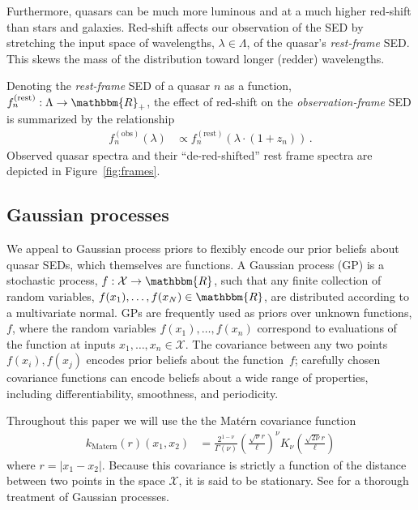 \documentclass{article}
\newcommand{\R}{\mathbbm{R}}
\newcommand{\mcX}{\mathcal{X}}
\begin{document}
Furthermore, quasars can be much more luminous and at a much higher red-shift than stars and galaxies.  
Red-shift affects our observation of the SED by stretching the input space of wavelengths, $\lambda \in \Lambda$, of the quasar's \emph{rest-frame} SED.  
This skews the mass of the distribution toward longer (redder) wavelengths. 

Denoting the \emph{rest-frame} SED of a quasar $n$ as a function, $f_n^{(\text{rest})} : \Lambda \rightarrow \R_+$, the effect of red-shift on the \emph{observation-frame} SED is summarized by the relationship 
\begin{align}
  f_n^{(\text{obs})}(\lambda) &\propto f_n^{(\text{rest})}(\lambda \cdot (1 + z_n)) \, .
\end{align}
Observed quasar spectra and their ``de-red-shifted'' rest frame spectra are depicted in Figure~\ref{fig:frames}.

\subsection{Gaussian processes}
We appeal to Gaussian process priors to flexibly encode our prior beliefs about quasar SEDs, which themselves are functions. A Gaussian process (GP) is a stochastic process, $f: \mathcal{X} \rightarrow \R$, such that any finite collection of random variables, ${f(x_1),\dots, f(x_N) \in \R}$, are distributed according to a multivariate normal.  
GPs are frequently used as priors over unknown functions, $f$, where the random variables $f(x_1), \dots, f(x_n)$ correspond to evaluations of the function at inputs $x_1, \dots, x_n \in \mcX$.  
The covariance between any two points $f(x_i), f(x_j)$ encodes prior beliefs about the function~$f$; carefully chosen covariance functions can encode beliefs about a wide range of properties, including differentiability, smoothness, and periodicity.  

Throughout this paper we will use the the Mat\'{e}rn \cite{Matern1986spatial} covariance function
\begin{align}
  k_{\text{Matern}}(r)(x_1, x_2) 
    &= \frac{2^{1-\nu}}{\Gamma(\nu)} 
       \left( \frac{\sqrt{\nu} r}{\ell} \right) ^\nu
       K_\nu\left( \frac{\sqrt{2\nu} r}{\ell}\right)
\end{align}
where $r = |x_1 - x_2|$.  Because this covariance is strictly a function of the distance between two points in the space $\mcX$, it is said to be stationary. 
See \cite{rasmussen2006gaussian} for a thorough treatment of Gaussian processes.  
\end{document}
